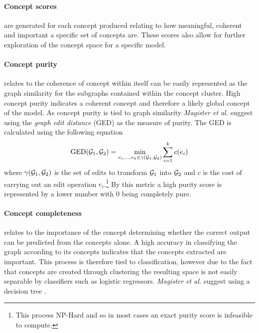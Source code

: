 \paragraph{Concept scores} are generated for each concept produced relating to how meaningful, coherent and important a specific set of concepts are.
These scores also allow for further exploration of the concept space for a specific model.

\paragraph{Concept purity}
relates to the coherence of concept within itself can be easily represented as the graph similarity for the subgraphs contained within the concept cluster.
High concept purity indicates a coherent concept and therefore a likely global concept of the model.
As concept purity is tied to graph similarity \textit{Magister et al.}\cite{magister2021gcexplainer} suggest using the \emph{graph edit distance} (GED) as the measure of purity.
The GED is calculated using the following equation
\begin{equation}
    \label{eq:GED}
    \operatorname{GED}({\mathcal{G}}_1, {\mathcal{G}}_2) = \underset{e_i,...,e_k \in \gamma({\mathcal{G}}_1, {\mathcal{G}}_2)}{\operatorname{min}} \sum_{i=1}^{k}c(e_i)
\end{equation}
where $\gamma({\mathcal{G}}_1, {\mathcal{G}}_2)$ is the set of edits to transform ${\mathcal{G}}_1$ into ${\mathcal{G}}_2$ and $c$ is the cost of carrying out an edit operation $e_i$.\footnote{This process NP-Hard and so in most cases an exact purity score is infeasible to compute.}
By this metric a high purity score is represented by a lower number with 0 being completely pure.

\paragraph{Concept completeness}
relates to the importance of the concept determining whether the correct output can be predicted from the concepts alone.
A high accuracy in classifying the graph according to its concepts indicates that the concepts extracted are important.
This process is therefore tied to classification, however due to the fact that concepts are created through clustering the resulting space is not easily separable by classifiers such as logistic regressors.
\textit{Magister et al.}\cite{magister2021gcexplainer} suggest using a decision tree \cite{kazhdan2020now}.


